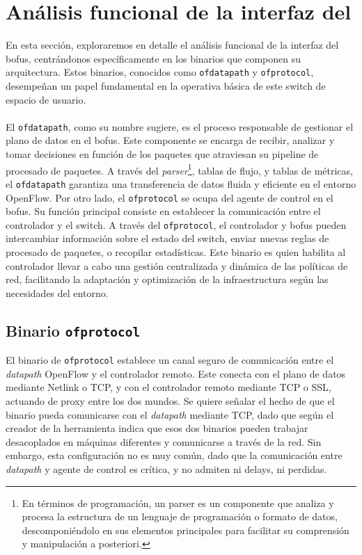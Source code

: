 \section{Análisis funcional de la interfaz del }
\label{sec:ana_bofuss}

En esta sección, exploraremos en detalle el análisis funcional de la interfaz del \gls{bofus}, centrándonos específicamente en los binarios que componen su arquitectura. Estos binarios, conocidos como \texttt{ofdatapath} y \texttt{ofprotocol}, desempeñan un papel fundamental en la operativa básica de este switch de espacio de usuario.\\
\\
El \texttt{ofdatapath}, como su nombre sugiere, es el proceso responsable de gestionar el plano de datos en el \gls{bofus}. Este componente se encarga de recibir, analizar y tomar decisiones en función de los paquetes que atraviesan su pipeline de procesado de paquetes. A través del \textit{parser}\footnote{En términos de programación, un parser es un componente que analiza y procesa la estructura de un lenguaje de programación o formato de datos, descomponiéndolo en sus elementos principales para facilitar su comprensión y manipulación a posteriori.}, tablas de flujo, y tablas de métricas, el \texttt{ofdatapath} garantiza una transferencia de datos fluida y eficiente en el entorno OpenFlow. Por otro lado, el \texttt{ofprotocol} se ocupa del agente de control en el \gls{bofus}. Su función principal consiste en establecer la comunicación entre el controlador y el switch. A través del \texttt{ofprotocol}, el controlador y \gls{bofus} pueden intercambiar información sobre el estado del switch, enviar nuevas reglas de procesado de paquetes, o recopilar estadísticas. Este binario es quien habilita al controlador llevar a cabo una gestión centralizada y dinámica de las políticas de red, facilitando la adaptación y optimización de la infraestructura según las necesidades del entorno.\\


\subsection{Binario \texttt{ofprotocol}}

El binario de \texttt{ofprotocol} establece un canal seguro de comunicación entre el \textit{datapath} OpenFlow y el controlador remoto. Este conecta con el plano de datos mediante Netlink o TCP, y con el controlador remoto mediante TCP o SSL, actuando de proxy entre los dos mundos. Se quiere señalar el hecho de que el binario pueda comunicarse con el \textit{datapath} mediante TCP, dado que según el creador de la herramienta indica que esos dos binarios pueden trabajar desacoplados en máquinas diferentes y comunicarse a través de la red. Sin embargo, esta configuración no es muy común, dado que la comunicación entre \textit{datapath} y agente de control es crítica, y no admiten ni delays, ni perdidas.\\


